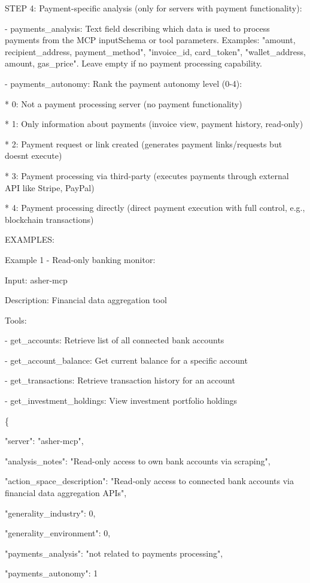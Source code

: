 \documentclass[manuscript,screen,nonacm,oneside]{acmart}
\begin{document}
STEP 4: Payment-specific analysis (only for servers with payment functionality):

- payments\_analysis: Text field describing which data is used to process payments from the MCP inputSchema or tool parameters. Examples: "amount, recipient\_address, payment\_method", "invoice\_id, card\_token", "wallet\_address, amount, gas\_price". Leave empty if no payment processing capability.

- payments\_autonomy: Rank the payment autonomy level (0-4):

* 0: Not a payment processing server (no payment functionality)

* 1: Only information about payments (invoice view, payment history, read-only)

* 2: Payment request or link created (generates payment links/requests but doesn\textquotesingle t execute)

* 3: Payment processing via third-party (executes payments through external API like Stripe, PayPal)

* 4: Payment processing directly (direct payment execution with full control, e.g., blockchain transactions)

EXAMPLES:

Example 1 - Read-only banking monitor:

Input: asher-mcp

Description: Financial data aggregation tool

Tools:

- get\_accounts: Retrieve list of all connected bank accounts

- get\_account\_balance: Get current balance for a specific account

- get\_transactions: Retrieve transaction history for an account

- get\_investment\_holdings: View investment portfolio holdings

\{

"server": "asher-mcp",

"analysis\_notes": "Read-only access to own bank accounts via scraping",

"action\_space\_description": "Read-only access to connected bank accounts via financial data aggregation APIs",

"generality\_industry": 0,

"generality\_environment": 0,

"payments\_analysis": "not related to payments processing",

"payments\_autonomy": 1
\end{document}
